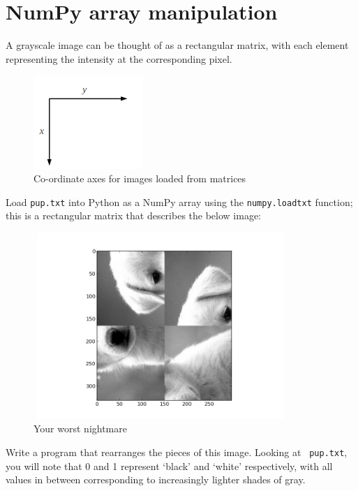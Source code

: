 \documentclass{article}
\begin{document}
\section*{NumPy array manipulation}
A grayscale image can be thought of as a rectangular matrix, with each element
representing the intensity at the corresponding pixel. \newline
\begin{figure}[h]
\begin{center}
\includegraphics[height=100pt]{../pictures/image_axes.png}
\caption{Co-ordinate axes for images loaded from matrices}
\end{center}
\end{figure}
\newline
Load \texttt{pup.txt} into Python as a NumPy array using the \texttt{numpy.loadtxt} 
function; this is a rectangular matrix that describes the below image:
\newline
\begin{figure}[h]
\begin{center}
\includegraphics[height=200pt, width=275pt]{pup.png}
\caption{Your worst nightmare}
\end{center}
\end{figure}

Write a program that rearranges the pieces of this image. Looking at \texttt{
pup.txt}, you will note that 0 and 1 represent `black' and `white' respectively,
with all values in between corresponding to increasingly lighter shades of gray.
\end{document}
